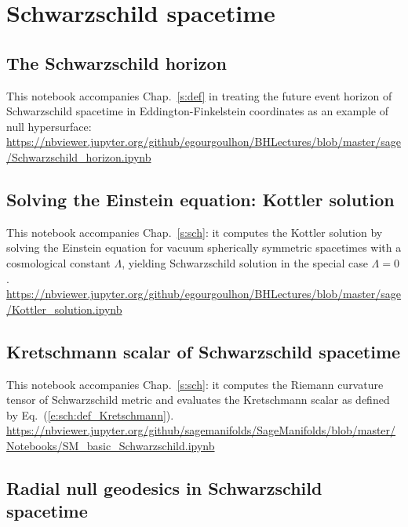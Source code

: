 \section{Schwarzschild spacetime}

\subsection{The Schwarzschild horizon} \label{s:sam:Schwarz_hor}

This notebook accompanies Chap.~\ref{s:def} in treating the future event horizon of
Schwarzschild spacetime in Eddington-Finkelstein coordinates as an example of null hypersurface:\\[1ex]
{\footnotesize
\url{https://nbviewer.jupyter.org/github/egourgoulhon/BHLectures/blob/master/sage/Schwarzschild_horizon.ipynb}
}


\subsection{Solving the Einstein equation: Kottler solution} \label{s:sam:Kottler_solution}

This notebook accompanies Chap.~\ref{s:sch}: it computes the Kottler solution by solving the Einstein
equation for vacuum spherically symmetric spacetimes with a cosmological constant $\Lambda$,
yielding Schwarzschild solution in the special case $\Lambda=0$. \\[1ex]
{\footnotesize
\url{https://nbviewer.jupyter.org/github/egourgoulhon/BHLectures/blob/master/sage/Kottler_solution.ipynb}
}

\subsection{Kretschmann scalar of Schwarzschild spacetime} \label{s:sam:Kretschmann_Schwarz}

This notebook accompanies Chap.~\ref{s:sch}: it computes the Riemann curvature
tensor of Schwarzschild metric and evaluates the Kretschmann scalar as defined
by Eq.~(\ref{e:sch:def_Kretschmann}). \\[1ex]
{\footnotesize
\url{https://nbviewer.jupyter.org/github/sagemanifolds/SageManifolds/blob/master/Notebooks/SM_basic_Schwarzschild.ipynb}
}

\subsection{Radial null geodesics in Schwarzschild spacetime}

